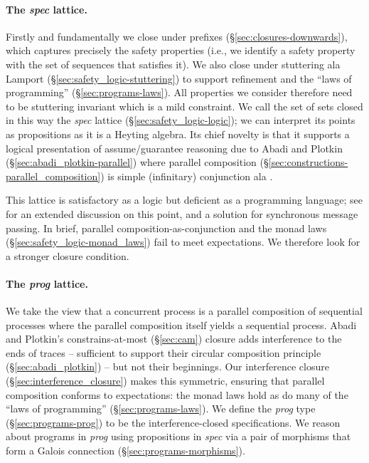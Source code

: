 \documentclass[11pt,a4paper]{article}
\begin{document}
\paragraph{The \emph{spec} lattice.} Firstly and fundamentally we
close under prefixes (\S\ref{sec:closures-downwards}), which captures
precisely the safety properties (i.e., we identify a safety property
with the set of sequences that satisfies it). We also close under
stuttering ala Lamport (\S\ref{sec:safety_logic-stuttering}) to
support refinement and the ``laws of programming''
(\S\ref{sec:programs-laws}). All properties we consider therefore need
to be stuttering invariant which is a mild constraint. We call the set
of sets closed in this way the \emph{spec} lattice
(\S\ref{sec:safety_logic-logic}); we can interpret its points as
propositions as it is a Heyting algebra. Its chief novelty is that it
supports a logical presentation of assume/guarantee reasoning due to
Abadi and Plotkin (\S\ref{sec:abadi_plotkin-parallel}) where parallel
composition (\S\ref{sec:constructions-parallel_composition}) is simple
(infinitary) conjunction ala \citet{Lamport:1994}.

This lattice is satisfactory as a logic but deficient as a programming
language; see \citet{Zwiers:1989} for an extended discussion on this
point, and a solution for synchronous message passing. In brief,
parallel composition-as-conjunction and the monad laws
(\S\ref{sec:safety_logic-monad_laws}) fail to meet expectations. We
therefore look for a stronger closure condition.

\paragraph{The \emph{prog} lattice.} We take the view that a
concurrent process is a parallel composition of sequential processes
where the parallel composition itself yields a sequential
process. Abadi and Plotkin's constrains-at-most (\S\ref{sec:cam})
closure adds interference to the ends of traces -- sufficient to
support their circular composition principle
(\S\ref{sec:abadi_plotkin}) -- but not their beginnings. Our
interference closure (\S\ref{sec:interference_closure}) makes this
symmetric, ensuring that parallel composition conforms to
expectations: the monad laws hold as do many of the ``laws of
programming'' (\S\ref{sec:programs-laws}). We define the \emph{prog}
type (\S\ref{sec:programs-prog}) to be the interference-closed
specifications. We reason about programs in \emph{prog} using
propositions in \emph{spec} via a pair of morphisms that form a Galois
connection (\S\ref{sec:programs-morphisms}).
\end{document}
